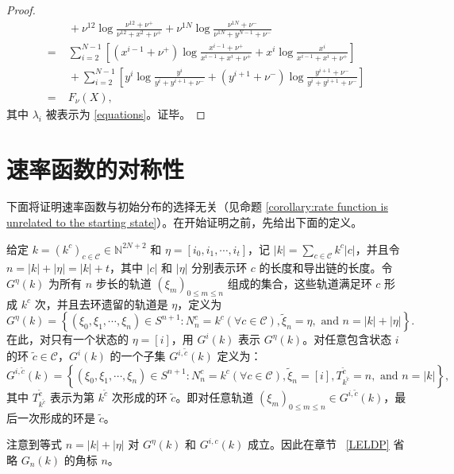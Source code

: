 \begin{appendices}
\begin{proof}
\begin{align*}
        &\;+\nu^{12}\log\frac{\nu^{12}+\nu^{+}}{\nu^{12}+x^{2}+\nu^{+}}+\nu^{1N}\log\frac{\nu^{1N}+\nu^{-}}{\nu^{1N}+y^{N-1}+\nu^{-}}\\
        =&\;\sum_{i=2}^{N-1}\left[ \left(x^{i-1}+\nu^+\right)\log\frac{x^{i-1}+\nu^+}{x^{i-1}+x^{i}+\nu^+} + x^{i}\log\frac{x^{i}}{x^{i-1}+x^{i}+\nu^+}  \right]\\
        &\;+\sum_{i=2}^{N-1}  \left[y^{i}\log\frac{y^{i}}{y^{i} +y^{i+1} +\nu^-} + \left(y^{i+1} +\nu^-\right)\log\frac{y^{i+1} +\nu^-}{y^{i} +y^{i+1} +\nu^-}\right]\\
        =&\;F_{\nu}(X),
        \end{align*}
        其中 $\lambda_i$ 被表示为 \eqref{equations}。证毕。
\end{proof}

\section{速率函数的对称性} \label{appendix:symmetry}
下面将证明速率函数与初始分布的选择无关（见命题 \ref{corollary:rate function is unrelated to the starting state}）。在开始证明之前，先给出下面的定义。

给定 $k=(k^c)_{c\in\mathcal{C}}\in \mathbb{N}^{2N+2}$ 和 $\eta=[i_0,i_1,\cdots,i_t]$，记 $|k|=\sum_{c\in\mathcal{C}}k^c|c|$，并且令 $n=|k|+|\eta|=|k|+t$，其中 $|c|$ 和 $|\eta|$ 分别表示环 $c$ 的长度和导出链的长度。令 $G^{\eta}(k)$ 为所有 $n$ 步长的轨道 $(\xi_m)_{0\le m\le n}$ 组成的集合，这些轨道满足环 $c$ 形成 $k^c$ 次，并且去环遗留的轨道是 $\eta$，定义为
\begin{equation*}
	G^{\eta}(k)=\left\{(\xi_0,\xi_1,\cdots,\xi_n)\in S^{n+1}:N^c_n=k^c (\forall c\in \mathcal{C}),\tilde{\xi}_n=\eta,\text{ and }n=|k|+|\eta|\right\}.
\end{equation*}
在此，对只有一个状态的 $\eta =[i]$，用 $G^{i}(k)$ 表示 $G^{\eta}(k)$。对任意包含状态 $i$ 的环 $\tilde{c}\in \mathcal{C}$，$G^i(k)$ 的一个子集 $G^{i,\tilde{c}}(k)$ 定义为：
\begin{equation*}
	G^{i,\tilde{c}}(k)=\left\{(\xi_0,\xi_1,\cdots,\xi_n)\in S^{n+1}:N^c_n=k^c (\forall c\in \mathcal{C}),\tilde{\xi}_n=[i],T^{\tilde{c}}_{k^{\tilde{c}}}=n,\text{ and }n=|k|\right\},
\end{equation*}
其中 $T^{\tilde{c}}_{k^{\tilde{c}}}$ 表示为第 $k^{\tilde{c}}$ 次形成的环 $\tilde{c}$。即对任意轨道 $(\xi_m)_{0\le m\le n}\in G^{i,\tilde{c}}(k)$，最后一次形成的环是 $\tilde{c}$。

注意到等式 $n=|k|+|\eta|$ 对 $G^{\eta}(k)$ 和 $G^{i,c}(k)$ 成立。因此在章节 ~\ref{LELDP} 省略 $G_n(k)$ 的角标 $n$。


\end{appendices}
